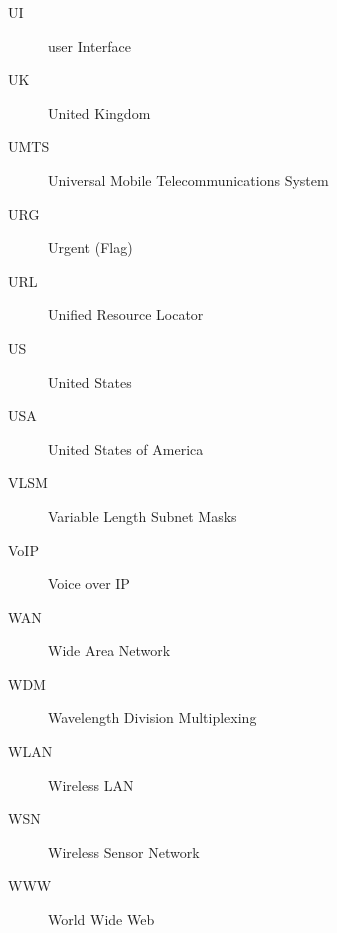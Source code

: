 \begin{description}
		\item[UI] user Interface
		\item[UK] United Kingdom
		\item[UMTS] Universal Mobile Telecommunications System
		\item[URG] Urgent (Flag)
		\item[URL] Unified Resource Locator
		\item[US] United States
		\item[USA] United States of America
		\item[VLSM] Variable Length Subnet Masks
		\item[VoIP] Voice over IP
		\item[WAN] Wide Area Network
		\item[WDM] Wavelength Division Multiplexing
		\item[WLAN] Wireless LAN
		\item[WSN] Wireless Sensor Network
		\item[WWW] World Wide Web
	\end{description}
